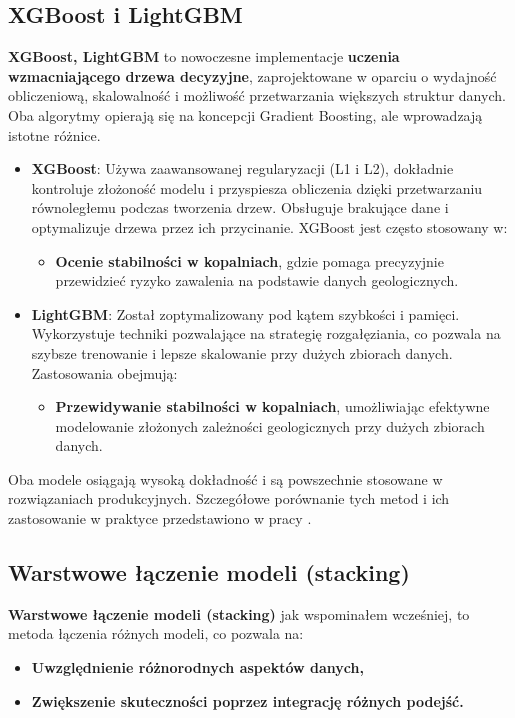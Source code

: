 \subsection{XGBoost i LightGBM}
\textbf{XGBoost, LightGBM} to nowoczesne implementacje \textbf{uczenia wzmacniającego drzewa decyzyjne}, zaprojektowane w oparciu o wydajność obliczeniową, skalowalność i możliwość przetwarzania większych struktur danych. Oba algorytmy opierają się na koncepcji Gradient Boosting, ale wprowadzają istotne różnice.

\begin{itemize}
	\item
	      \textbf{XGBoost}: Używa zaawansowanej regularyzacji (L1 i L2), dokładnie kontroluje złożoność modelu i przyspiesza obliczenia dzięki przetwarzaniu równoległemu podczas tworzenia drzew. Obsługuje brakujące dane i optymalizuje drzewa przez ich przycinanie. XGBoost jest często stosowany w:
	      \begin{itemize}
		      \item \textbf{Ocenie stabilności w kopalniach}, gdzie pomaga precyzyjnie przewidzieć ryzyko zawalenia na podstawie danych geologicznych.
	      \end{itemize}

	\item
	      \textbf{LightGBM}: Został zoptymalizowany pod kątem szybkości i pamięci. Wykorzystuje techniki pozwalające na strategię rozgałęziania, co pozwala na szybsze trenowanie i lepsze skalowanie przy dużych zbiorach danych. Zastosowania obejmują:
	      \begin{itemize}
		      \item
		            \textbf{Przewidywanie stabilności w kopalniach}, umożliwiając efektywne modelowanie złożonych zależności geologicznych przy dużych zbiorach danych.
	      \end{itemize}
\end{itemize}

Oba modele osiągają wysoką dokładność i są powszechnie stosowane w rozwiązaniach produkcyjnych. Szczegółowe porównanie tych metod i ich zastosowanie w praktyce przedstawiono w pracy \cite{XGBoost_LightGBM}.

\subsection{Warstwowe łączenie modeli (stacking)}
\textbf{Warstwowe łączenie modeli (stacking)} jak wspominałem wcześniej, to metoda łączenia różnych modeli, co pozwala na:
\begin{itemize}
	\item
	      \textbf{Uwzględnienie różnorodnych aspektów danych,}
	\item
	      \textbf{Zwiększenie skuteczności poprzez integrację różnych podejść.}
\end{itemize}

